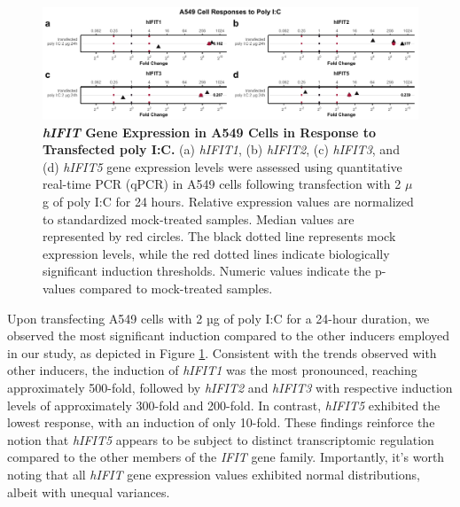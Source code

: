 \begin{figure}
    \centering
    \includegraphics[width=1\linewidth]{06. Chapter 1/Figs/01. Induction/04. a549_treat_polyic.pdf}
    \caption[\textit{hIFIT} Gene Expression in A549 Cells in Response to Transfected poly I:C.]{\textbf{\textit{hIFIT} Gene Expression in A549 Cells in Response to Transfected poly I:C.} (a) \textit{hIFIT1}, (b) \textit{hIFIT2}, (c) \textit{hIFIT3}, and (d) \textit{hIFIT5} gene expression levels were assessed using quantitative real-time PCR (qPCR) in A549 cells following transfection with 2 \(\mu\)g of poly I:C for 24 hours.  Relative expression values are normalized to standardized mock-treated samples. Median values are represented by red circles. The black dotted line represents mock expression levels, while the red dotted lines indicate biologically significant induction thresholds. Numeric values indicate the p-values compared to mock-treated samples.}
    \label{fig:A549 Response to poly I:C}
\end{figure}

Upon transfecting A549 cells with 2 µg of poly I:C for a 24-hour duration, we observed the most significant induction compared to the other inducers employed in our study, as depicted in Figure \ref{fig:A549 Response to poly I:C}. Consistent with the trends observed with other inducers, the induction of \textit{hIFIT1} was the most pronounced, reaching approximately 500-fold, followed by \textit{hIFIT2} and \textit{hIFIT3} with respective induction levels of approximately 300-fold and 200-fold. In contrast, \textit{hIFIT5} exhibited the lowest response, with an induction of only 10-fold. These findings reinforce the notion that \textit{hIFIT5} appears to be subject to distinct transcriptomic regulation compared to the other members of the \textit{IFIT} gene family. Importantly, it's worth noting that all \textit{hIFIT} gene expression values exhibited normal distributions, albeit with unequal variances. 

